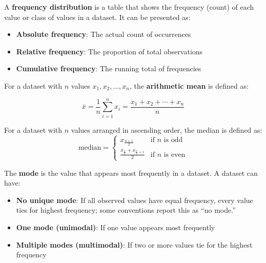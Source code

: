 \begin{definition}
A \textbf{frequency distribution} is a table that shows the frequency (count) of each value or class of values in a dataset. It can be presented as:
\begin{itemize}
    \item \textbf{Absolute frequency}: The actual count of occurrences
    \item \textbf{Relative frequency}: The proportion of total observations
    \item \textbf{Cumulative frequency}: The running total of frequencies
\end{itemize}
\end{definition}

\begin{definition}

For a dataset with $n$ values $x_1, x_2, \ldots, x_n$, the \textbf{arithmetic mean} is defined as:

$$
\bar{x} = \frac{1}{n}\sum_{i=1}^{n} x_i = \frac{x_1 + x_2 + \cdots + x_n}{n}
$$

\end{definition}

\begin{definition}[Median]
    For a dataset with $n$ values arranged in ascending order, the median is defined as:
    \[
    \text{median} =
    \begin{cases}
        x_{\frac{n+1}{2}} & \text{if } n \text{ is odd} \\
        \frac{x_{\frac{n}{2}} + x_{\frac{n}{2}+1}}{2} & \text{if } n \text{ is even}
    \end{cases}
    \]
\end{definition}

\begin{definition}[Mode]
The \textbf{mode} is the value that appears most frequently in a dataset. A dataset can have:
\begin{itemize}
    \item \textbf{No unique mode}: If all observed values have equal frequency, every value ties for highest frequency; some conventions report this as ``no mode.''
    \item \textbf{One mode (unimodal)}: If one value appears most frequently
    \item \textbf{Multiple modes (multimodal)}: If two or more values tie for the highest frequency
\end{itemize}
\end{definition}

